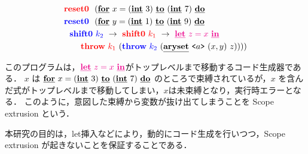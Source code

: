 \begin{align*}
  &\red{\Resetz} ~~(\cforin{x=(\cint~3)}{(\cint~7)} \\
  &\blue{\Resetz} ~~(\cforin{y=(\cint~1)}{(\cint~9)} \\
  &~~\blue{\Shiftz}~\blue{k_2}~\to~ \red{\Shiftz}~\red{k_1}~\to~ \magenta{\cLet~z=x~\cIn} \\
  &~~~~~~
    \red{\Throw}~\red{k_1}~(\blue{\Throw}~\blue{k_2}~(\caryset{\code{a}}{(x,y)}{z}))))
\end{align*}

このプログラムは，$\magenta{\cLet~z=x~\cIn}$がトップレベルまで移動するコード生成器である．
$x$ は $\cforin{x=(\cint~3)}{(\cint~7)}$ のところで束縛されているが，$x$ を含んだ式がトップレベルまで移動してしまい，$x$は未束縛となり，実行時エラーとなる．
このように，意図した束縛から変数が抜け出てしまうことを Scope extrusion という．

本研究の目的は，let挿入などにより，動的にコード生成を行いつつ，Scope extrusion が起きないことを保証することである．

